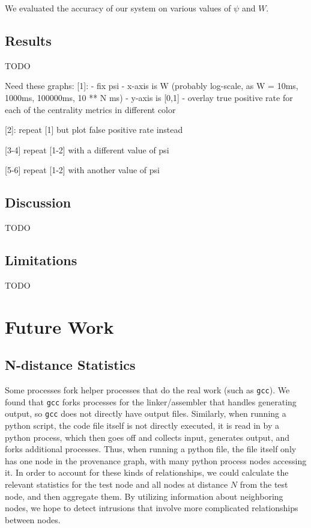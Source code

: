 \documentclass[10pt,twocolumn]{article}
\begin{document}
We evaluated the accuracy of our system on various values of $\psi$ and $W$.

\subsection{Results}

TODO

Need these graphs:
[1]:
- fix psi
- x-axis is W (probably log-scale, as W = 10ms, 1000ms, 100000ms, 10 ** N ms)
- y-axis is [0,1]
- overlay true positive rate for each of the centrality metrics in different color

[2]: repeat [1] but plot false positive rate instead

[3-4] repeat [1-2] with a different value of psi

[5-6] repeat [1-2] with another value of psi

\subsection{Discussion}

TODO

\subsection{Limitations}

TODO


%

\section{Future Work}

\subsection{N-distance Statistics}
Some processes fork helper processes that do the real work (such as \texttt{gcc}). We found that \texttt{gcc} forks processes for the linker/assembler that handles generating output, so \texttt{gcc} does not directly have output files. Similarly, when running a python script, the code file itself is not directly executed, it is read in by a python process, which then goes off and collects input, generates output, and forks additional processes. Thus, when running a python file, the file itself only has one node in the provenance graph, with many python process nodes accessing it. In order to account for these kinds of relationships, we could calculate the relevant statistics for the test node and all nodes at distance $N$ from the test node, and then aggregate them. By utilizing information about neighboring nodes, we hope to detect intrusions that involve more complicated relationships
between nodes.
\end{document}
